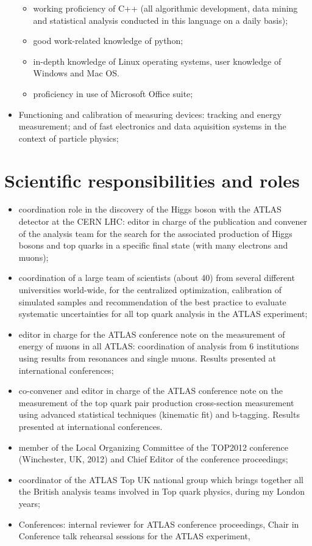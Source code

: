 \documentclass{article}
\begin{document}
\begin{vita}
\begin{itemize}
\begin{itemize}
\item working proficiency of C++ (all algorithmic development, data mining and statistical analysis conducted in this language on a daily basis); 
\item good work-related knowledge of python; 
\item in-depth knowledge of Linux operating systems, user knowledge of Windows and Mac OS.  
\item proficiency in use of Microsoft Office suite;
\end{itemize}
\item Functioning and calibration of measuring devices: tracking and energy measurement; and of fast electronics and data aquisition systems in the context of particle physics; 
\end{itemize}

\section*{Scientific responsibilities and roles}
\begin{itemize}
\item coordination role in the discovery of the Higgs boson with the ATLAS detector at the CERN LHC: editor in charge of the publication and convener of the analysis team for the search for the associated production of Higgs bosons and top quarks in a specific final state (with many electrons and muons);
\item coordination of a large team of scientists (about 40) from several different universities world-wide, for the centralized optimization, calibration of simulated samples and recommendation of the best practice to evaluate systematic uncertainties for all top quark analysis in the ATLAS experiment;
\item editor in charge for the ATLAS conference note on the measurement of energy of muons in all ATLAS: coordination of analysis from 6 institutions using results from resonances and single muons. Results presented at international conferences;
\item co-convener and editor in charge of the ATLAS conference note on the measurement of the top quark pair production cross-section measurement using advanced statistical techniques (kinematic fit) and b-tagging. Results presented at international conferences.
\item member of the Local Organizing Committee of the TOP2012 conference (Winchester, UK, 2012) and Chief Editor of the conference proceedings;
\item coordinator of the ATLAS Top UK national group which brings together all the British analysis teams involved in Top quark physics, during my London years;
\item Conferences: internal reviewer for ATLAS conference proceedings, Chair in Conference talk rehearsal sessions for the ATLAS experiment, 
\end{itemize}


\end{vita}
\end{document}

